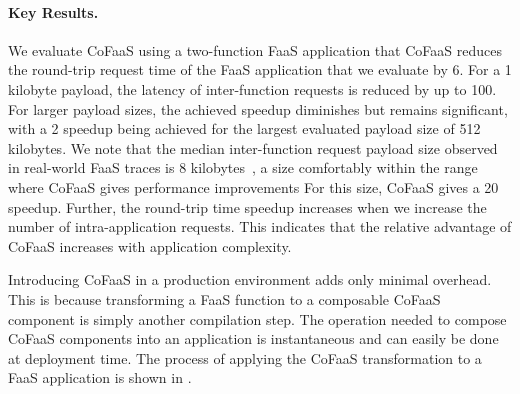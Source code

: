 \documentclass[../main.tex]{subfiles}
\begin{document}
\begin{refsection}
\paragraph{Key Results.}
We evaluate CoFaaS using a two-function FaaS application that CoFaaS
reduces the round-trip request time of the FaaS application that we
evaluate by 6\texttimes. For a 1 kilobyte payload, the latency of
inter-function requests is reduced by up to 100\texttimes. For larger
payload sizes, the achieved speedup diminishes but remains
significant, with a 2\texttimes{} speedup being achieved for the
largest evaluated payload size of 512 kilobytes. We note that the
median inter-function request payload size observed in real-world FaaS
traces is 8 kilobytes~\cite{mahgoub22_wisef}, a size comfortably
within the range where CoFaaS gives performance improvements For this
size, CoFaaS gives a 20\texttimes{} speedup. Further, the round-trip
time speedup increases when we increase the number of
intra-application requests. This indicates that the relative advantage of CoFaaS increases with application complexity.

Introducing CoFaaS in a production environment adds only minimal
overhead. This is because transforming a FaaS function to a composable
CoFaaS component is simply another compilation step. The operation
needed to compose CoFaaS components into an application is
instantaneous and can easily be done at deployment time. The process
of applying the CoFaaS transformation to a FaaS application is shown
in .


\ifx\chapincluded\undefined
  \printbibliography
  \end{refsection}
 \fi
\end{document}
